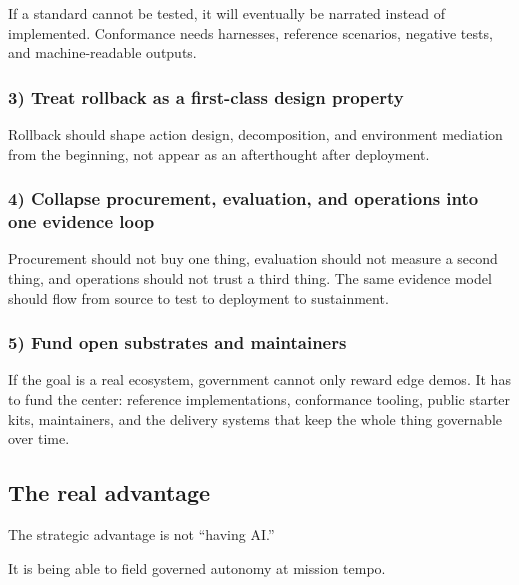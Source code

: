 \documentclass[11pt]{article}
\begin{document}
If a standard cannot be tested, it will eventually be narrated instead
of implemented. Conformance needs harnesses, reference scenarios,
negative tests, and machine-readable outputs.

\hypertarget{treat-rollback-as-a-first-class-design-property}{%
\subsubsection{3) Treat rollback as a first-class design
property}\label{treat-rollback-as-a-first-class-design-property}}

Rollback should shape action design, decomposition, and environment
mediation from the beginning, not appear as an afterthought after
deployment.

\hypertarget{collapse-procurement-evaluation-and-operations-into-one-evidence-loop}{%
\subsubsection{4) Collapse procurement, evaluation, and operations into
one evidence
loop}\label{collapse-procurement-evaluation-and-operations-into-one-evidence-loop}}

Procurement should not buy one thing, evaluation should not measure a
second thing, and operations should not trust a third thing. The same
evidence model should flow from source to test to deployment to
sustainment.

\hypertarget{fund-open-substrates-and-maintainers}{%
\subsubsection{5) Fund open substrates and
maintainers}\label{fund-open-substrates-and-maintainers}}

If the goal is a real ecosystem, government cannot only reward edge
demos. It has to fund the center: reference implementations, conformance
tooling, public starter kits, maintainers, and the delivery systems that
keep the whole thing governable over time.

\hypertarget{the-real-advantage}{%
\subsection{The real advantage}\label{the-real-advantage}}

The strategic advantage is not ``having AI.''

It is being able to field governed autonomy at mission tempo.
\end{document}
